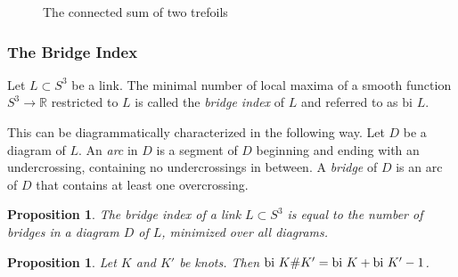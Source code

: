 \documentclass[a4paper]{article}
\newtheorem{proposition}[theorem]{Proposition}
\theoremstyle{definition}
\begin{document}
\begin{figure}[h]
\centering
{}
\caption{The connected sum of two trefoils}
\label{fig:connected-sum}
\end{figure}

\subsubsection{The Bridge Index}\label{subsubsec:bridge-index}
Let $L \subset S^3$ be a link. The minimal number of local maxima of a smooth function $S^3 \rightarrow \mathbb{R}$ restricted to $L$ is called the \textit{bridge index} of $L$ and referred to as $\text{bi } L$.

This can be diagrammatically characterized in the following way. Let $D$ be a diagram of $L$. An \textit{arc} in $D$ is a segment of $D$ beginning and ending with an undercrossing, containing no undercrossings in between. A \textit{bridge} of $D$ is an arc of $D$ that contains at least one overcrossing.

\begin{proposition}
The bridge index of a link $L \subset S^3$ is equal to the number of bridges in a diagram $D$ of $L$, minimized over all diagrams.
\end{proposition}


\begin{proposition}\label{prop:bridge-index-connected-sum}
Let $K$ and $K'$ be knots. Then $\textup{bi } K\#K' = \textup{bi } K + \textup{bi }K' - 1$.
\end{proposition}
\end{document}

